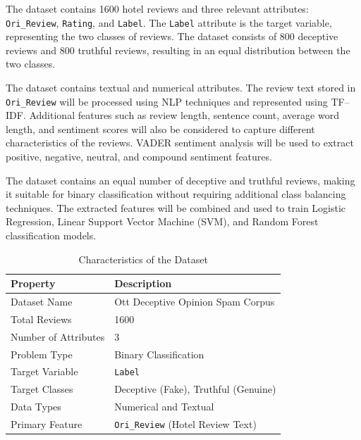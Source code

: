 \documentclass[12pt,a4paper]{report}
\begin{document}
The dataset contains 1600 hotel reviews and three relevant attributes: \texttt{Ori\_Review}, \texttt{Rating}, and \texttt{Label}. The \texttt{Label} attribute is the target variable, representing the two classes of reviews. The dataset consists of 800 deceptive reviews and 800 truthful reviews, resulting in an equal distribution between the two classes.

The dataset contains textual and numerical attributes. The review text stored in \texttt{Ori\_Review} will be processed using NLP techniques and represented using TF--IDF. Additional features such as review length, sentence count, average word length, and sentiment scores will also be considered to capture different characteristics of the reviews. VADER sentiment analysis will be used to extract positive, negative, neutral, and compound sentiment features.

The dataset contains an equal number of deceptive and truthful reviews, making it suitable for binary classification without requiring additional class balancing techniques. The extracted features will be combined and used to train Logistic Regression, Linear Support Vector Machine (SVM), and Random Forest classification models.

\begin{table}[H]
\centering
\small
\renewcommand{\arraystretch}{1.3}
\begin{tabularx}{0.95\textwidth}{|>{\raggedright\arraybackslash}p{}|X|}
\hline
\textbf{Property} & \textbf{Description} \\
\hline
Dataset Name & Ott Deceptive Opinion Spam Corpus \\
\hline
Total Reviews & 1600 \\
\hline
Number of Attributes & 3 \\
\hline
Problem Type & Binary Classification \\
\hline
Target Variable & \texttt{Label} \\
\hline
Target Classes & Deceptive (Fake), Truthful (Genuine) \\
\hline
Data Types & Numerical and Textual \\
\hline
Primary Feature & \texttt{Ori\_Review} (Hotel Review Text) \\
\hline
\end{tabularx}
\caption{Characteristics of the Dataset}
\label{tab:datasetdescription}
\end{table}
\end{document}
